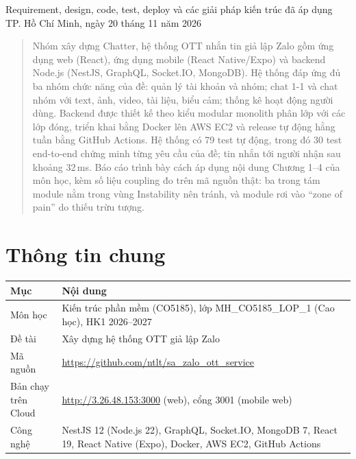 \documentclass[11pt, a4paper]{article}
\begin{document}
\sloppy   %

          {Requirement, design, code, test, deploy và các giải pháp kiến trúc đã áp dụng}
          {TP. Hồ Chí Minh, ngày 20 tháng 11 năm 2026}

\begin{abstract}
Nhóm xây dựng Chatter, hệ thống OTT nhắn tin giả lập Zalo gồm ứng dụng web (React), ứng dụng mobile (React Native/Expo) và backend Node.js (NestJS, GraphQL, Socket.IO, MongoDB). Hệ thống đáp ứng đủ ba nhóm chức năng của đề: quản lý tài khoản và nhóm; chat 1-1 và chat nhóm với text, ảnh, video, tài liệu, biểu cảm; thống kê hoạt động người dùng. Backend được thiết kế theo kiểu modular monolith phân lớp với các lớp đóng, triển khai bằng Docker lên AWS EC2 và release tự động hằng tuần bằng GitHub Actions. Hệ thống có 79 test tự động, trong đó 30 test end-to-end chứng minh từng yêu cầu của đề; tin nhắn tới người nhận sau khoảng 32\,ms. Báo cáo trình bày cách áp dụng nội dung Chương 1--4 của môn học, kèm số liệu coupling đo trên mã nguồn thật: ba trong tám module nằm trong vùng Instability nên tránh, và module  rơi vào ``zone of pain'' do thiếu trừu tượng.
\end{abstract}

\tableofcontents
\newpage

\section{Thông tin chung}

\begin{table}[H]
  \centering
  \small
  \begin{tabularx}{\linewidth}{lY}
    \toprule
    \textbf{Mục} & \textbf{Nội dung} \\
    \midrule
    Môn học & Kiến trúc phần mềm (CO5185), lớp MH\_CO5185\_LOP\_1 (Cao học), HK1 2026--2027 \\
    Đề tài & Xây dựng hệ thống OTT giả lập Zalo~\cite{detai2026} \\
    Mã nguồn & \url{https://github.com/ntlt/sa_zalo_ott_service} \\
    Bản chạy trên Cloud & \url{http://3.26.48.153:3000} (web), cổng 3001 (mobile web) \\
    Công nghệ & NestJS 12 (Node.js 22), GraphQL, Socket.IO, MongoDB 7, React 19, React Native (Expo), Docker, AWS EC2, GitHub Actions \\
    \bottomrule
  \end{tabularx}
\end{table}
\end{document}
